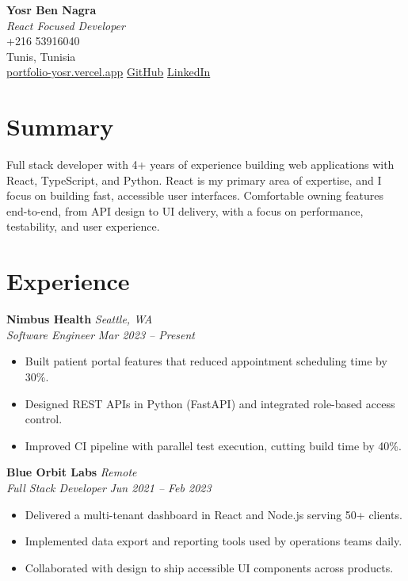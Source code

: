 \documentclass[11pt,a4paper]{article}
\begin{document}
\begin{center}
  {\LARGE\textbf{Yosr Ben Nagra}}\\
  \vspace{2pt}
  \textit{React Focused Developer}\\
  \vspace{4pt}
  +216 53916040\\
  Tunis, Tunisia\\
  \href{https://portfolio-yosr.vercel.app/en}{portfolio-yosr.vercel.app} \textbar{} \href{https://github.com/YosrBennagra}{GitHub} \textbar{} \href{https://www.linkedin.com/in/yosr-ben-nagra/}{LinkedIn}
\end{center}

\section*{Summary}
Full stack developer with 4+ years of experience building web applications with React, TypeScript, and Python. React is my primary area of expertise, and I focus on building fast, accessible user interfaces. Comfortable owning features end-to-end, from API design to UI delivery, with a focus on performance, testability, and user experience.

\section*{Experience}
\textbf{Nimbus Health} \hfill \textit{Seattle, WA}\\
\textit{Software Engineer} \hfill \textit{Mar 2023 -- Present}
\begin{itemize}[leftmargin=12pt,itemsep=2pt]
  \item Built patient portal features that reduced appointment scheduling time by 30\%.
  \item Designed REST APIs in Python (FastAPI) and integrated role-based access control.
  \item Improved CI pipeline with parallel test execution, cutting build time by 40\%.
\end{itemize}

\textbf{Blue Orbit Labs} \hfill \textit{Remote}\\
\textit{Full Stack Developer} \hfill \textit{Jun 2021 -- Feb 2023}
\begin{itemize}[leftmargin=12pt,itemsep=2pt]
  \item Delivered a multi-tenant dashboard in React and Node.js serving 50+ clients.
  \item Implemented data export and reporting tools used by operations teams daily.
  \item Collaborated with design to ship accessible UI components across products.
\end{itemize}
\end{document}
